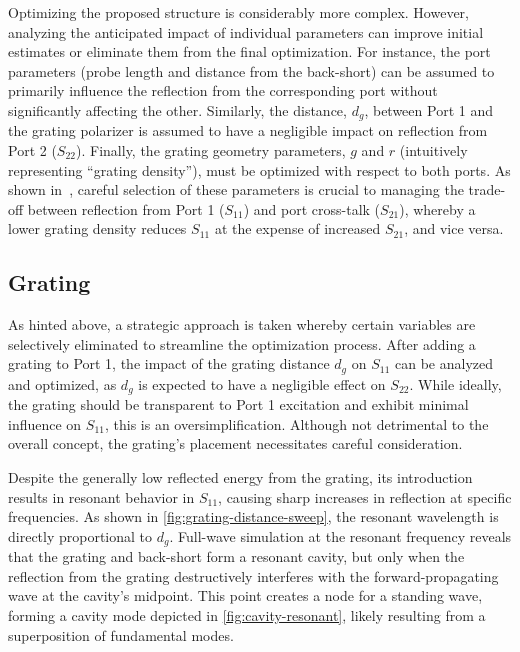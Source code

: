 \documentclass[14pt,a4paper]{ntust_report}
\begin{document}
Optimizing the proposed structure is considerably more complex. However, analyzing the anticipated impact of individual parameters can improve initial estimates or eliminate them from the final optimization. For instance, the port parameters (probe length and distance from the back-short) can be assumed to primarily influence the reflection from the corresponding port without significantly affecting the other. Similarly, the distance, $d_g$, between Port 1 and the grating polarizer is assumed to have a negligible impact on reflection from Port 2 ($S_{22}$). Finally, the grating geometry parameters, $g$ and $r$ (intuitively representing \enquote{grating density}), must be optimized with respect to both ports. As shown in~\parencite{karki-et-al:dual-polarized-probe-for-planar-near-field-measurement}, careful selection of these parameters is crucial to managing the trade-off between reflection from Port 1 ($S_{11}$) and port cross-talk ($S_{21}$), whereby a lower grating density reduces $S_{11}$ at the expense of increased $S_{21}$, and vice versa.

\subsection{Grating}
\label{subsection:grating}
As hinted above, a strategic approach is taken whereby certain variables are selectively eliminated to streamline the optimization process. After adding a grating to Port 1, the impact of the grating distance $d_g$ on $S_{11}$ can be analyzed and optimized, as $d_g$ is expected to have a negligible effect on $S_{22}$. While ideally, the grating should be transparent to Port 1 excitation and exhibit minimal influence on $S_{11}$, this is an oversimplification. Although not detrimental to the overall concept, the grating's placement necessitates careful consideration.

Despite the generally low reflected energy from the grating, its introduction results in resonant behavior in $S_{11}$, causing sharp increases in reflection at specific frequencies. As shown in \cref{fig:grating-distance-sweep}, the resonant wavelength is directly proportional to $d_g$. Full-wave simulation at the resonant frequency reveals that the grating and back-short form a resonant cavity, but only when the reflection from the grating destructively interferes with the forward-propagating wave at the cavity's midpoint. This point creates a node for a standing wave, forming a cavity mode depicted in \cref{fig:cavity-resonant}, likely resulting from a superposition of fundamental modes.
\end{document}
